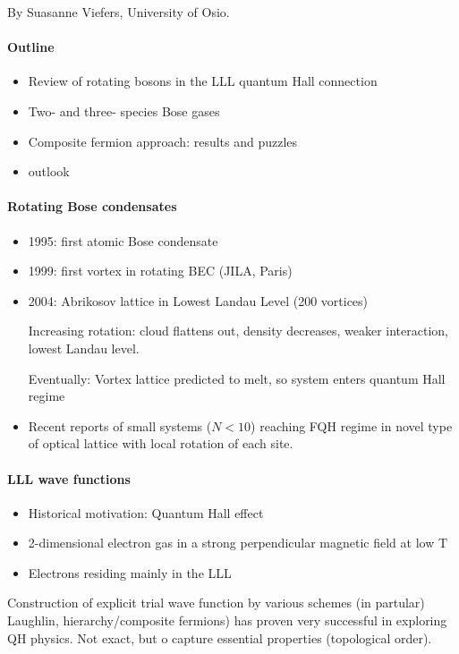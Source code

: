 \documentclass{article}
\numberwithin{equation}{subsection} %
\theoremstyle{definition}
\begin{document}
By Suasanne Viefers, University of Osio.
\paragraph{Outline}
\begin{itemize}
    \item Review of rotating bosons in the LLL quantum Hall connection
    \item Two- and three- species Bose gases
    \item Composite fermion approach: results and puzzles
    \item outlook
\end{itemize}

\paragraph{Rotating Bose condensates}
\begin{itemize}
    \item 1995: first atomic Bose condensate
    \item 1999: first vortex in rotating BEC (JILA, Paris)
    \item 2004: Abrikosov lattice in Lowest Landau Level (200 vortices)

        Increasing rotation: cloud flattens out, density decreases, weaker
        interaction, lowest Landau level.

        Eventually: Vortex lattice predicted to melt, so system enters
        quantum Hall regime
    \item Recent reports of small systems ($N<10$) reaching FQH regime in
        novel type of optical lattice with local rotation of each site.
\end{itemize}

\paragraph{LLL wave functions}
\begin{itemize}
    \item Historical motivation: Quantum Hall effect
    \item 2-dimensional electron gas in a strong perpendicular magnetic
        field at low T
    \item Electrons residing mainly in the LLL
\end{itemize}

Construction of explicit trial wave function by various schemes (in
partular) Laughlin, hierarchy/composite fermions) has proven very
successful in exploring QH physics. Not exact, but o capture essential
properties (topological order).
\end{document}
